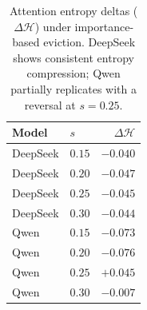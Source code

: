 \begin{table}[t]
\centering
\caption{Attention entropy deltas ($\Delta\mathcal{H}$) under importance-based eviction. DeepSeek shows consistent entropy compression; Qwen partially replicates with a reversal at $s{=}0.25$.}
\label{tab:entropy-deltas}
\small
\begin{tabular}{llr}
\toprule
Model & $s$ & $\Delta\mathcal{H}$ \\
\midrule
DeepSeek & $0.15$ & $-0.040$ \\
DeepSeek & $0.20$ & $-0.047$ \\
DeepSeek & $0.25$ & $-0.045$ \\
DeepSeek & $0.30$ & $-0.044$ \\
\midrule
Qwen & $0.15$ & $-0.073$ \\
Qwen & $0.20$ & $-0.076$ \\
Qwen & $0.25$ & $+0.045$ \\
Qwen & $0.30$ & $-0.007$ \\
\bottomrule
\end{tabular}
\end{table}
